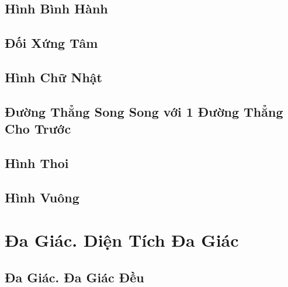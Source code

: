 \documentclass{article}
\numberwithin{equation}{section}
\begin{document}

\subsection{Hình Bình Hành}


\subsection{Đối Xứng Tâm}


\subsection{Hình Chữ Nhật}


\subsection{Đường Thẳng Song Song với 1 Đường Thẳng Cho Trước}


\subsection{Hình Thoi}


\subsection{Hình Vuông}


\section{Đa Giác. Diện Tích Đa Giác}

\subsection{Đa Giác. Đa Giác Đều}
\end{document}
